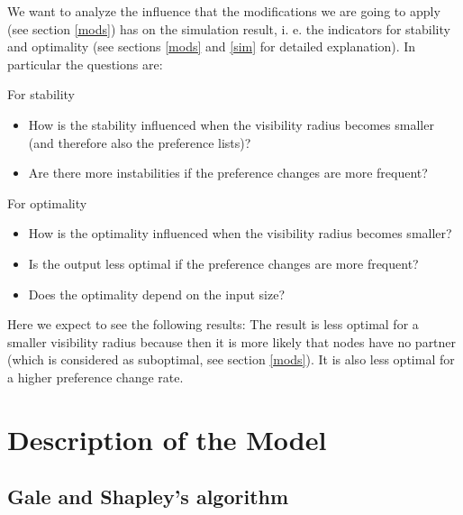 \documentclass[11pt]{article}
\begin{document}
We want to analyze the influence that the modifications we are going to apply (see section \ref{mods}) has on the simulation result, i. e. the
indicators for stability and optimality (see sections \ref{mods} and \ref{sim} for detailed explanation). In particular the questions are:

\noindent For stability
\begin{itemize}
  \item How is the stability influenced when the visibility radius becomes smaller (and therefore also the preference lists)?
  \item Are there more instabilities if the preference changes are more frequent?
\end{itemize}

\noindent For optimality
\begin{itemize}
  \item How is the optimality influenced when the visibility radius becomes smaller?
  \item Is the output less optimal if the preference changes are more frequent?
  \item Does the optimality depend on the input size?
\end{itemize}

Here we expect to see the following results: The result is less optimal for a smaller visibility radius because then it is more likely that nodes
have no partner (which is considered as suboptimal, see section \ref{mods}). It is also less optimal for a higher preference change rate.

\section{Description of the Model}

\subsection{Gale and Shapley's algorithm}
\end{document}
